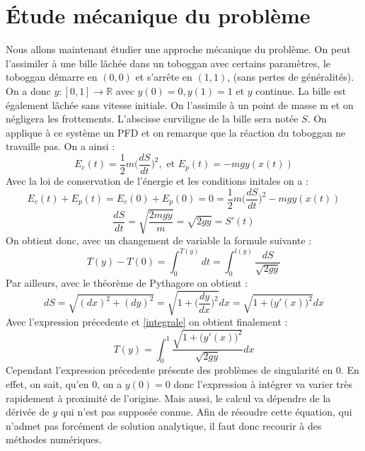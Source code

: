 \documentclass[a4paper,10pt]{article}
\begin{document}
\section{\'Etude m\'ecanique du probl\`eme}
Nous allons maintenant \'etudier une approche m\'ecanique du probl\`eme. On peut l'assimiler \`a une bille l\^ach\'ee dans un toboggan avec certains param\`etres, le toboggan d\'emarre en $(0,0)$
et s'arr\^ete en $(1,1)$, (sans pertes de g\'en\'eralit\'es). On a donc $y : [0,1]\longrightarrow \mathbb{R}$ avec $y(0) = 0, y(1) = 1$ et $y$ continue. La bille est \'egalement l\^ach\'ee sans vitesse initiale.
On l'assimile \`a un point de masse m et on n\'egligera les frottements. L'abscisse curviligne de la bille sera not\'ee $S$.
\newline
On applique \`a ce syst\`eme un PFD et on remarque que la r\'eaction du toboggan ne travaille pas. On a ainsi :
\begin{equation}
 E_c(t) = \frac{1}{2}m\Big(\frac{dS}{dt}\Big)^2, \text{ et } E_p(t) = -mgy(x(t))
\end{equation}
Avec la loi de conservation de l'\'energie et les conditions initales on a :
\begin{equation}
 E_c(t) + E_p(t) = E_c(0) + E_p(0) = 0 = \frac{1}{2}m\Big(\frac{dS}{dt}\Big)^2 - mgy(x(t)) 
\end{equation}
\begin{equation}
 \frac{dS}{dt}=\sqrt{\frac{2mgy}{m}} = \sqrt{2gy} = S'(t)
\end{equation}
On obtient donc, avec un changement de variable la formule suivante :
\begin{equation}
\label{integrale}
 T(y) - T(0) = \int_0^{T(y)} dt = \int_0^{l(y)} \frac{dS}{\sqrt{2gy}}
\end{equation}
Par ailleurs, avec le th\'eor\`eme de Pythagore on obtient :
\begin{equation}
 dS = \sqrt{(dx)^2 + (dy)^2} = \sqrt{1 + \Big(\frac{dy}{dx}\Big)^2}dx = \sqrt{1 + \Big(y'(x)\Big)^2}dx
\end{equation}
Avec l'expression pr\'ecedente et \ref{integrale} on obtient finalement :
\begin{equation}
 T(y) = \int_0^1 \frac{\sqrt{1 + \Big(y'(x)\Big)^2}}{\sqrt{2gy}}dx
\end{equation}
Cependant l'expression pr\'ecedente pr\'esente des probl\`emes de singularit\'e en 0. En effet, on sait, qu'en 0, on a $y(0) = 0$ donc l'expression \`a int\'egrer  va varier tr\`es rapidement
\`a proximit\'e de l'origine. Mais aussi, le calcul va d\'ependre de la d\'eriv\'ee de $y$ qui n'est pas suppos\'ee connue. Afin de r\'esoudre cette \'equation, qui n'admet pas forc\'ement de solution
analytique, il faut donc recourir \`a des m\'ethodes num\'eriques. 
\end{document}
